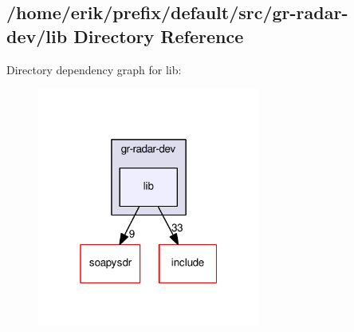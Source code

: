 \subsection{/home/erik/prefix/default/src/gr-\/radar-\/dev/lib Directory Reference}
\label{dir_adf2d9684ebe045e315ba550c6c6cd76}
Directory dependency graph for lib\+:
\nopagebreak
\begin{figure}[H]
\begin{center}
\leavevmode
\includegraphics[width=208pt]{dir_adf2d9684ebe045e315ba550c6c6cd76_dep}
\end{center}
\end{figure}

